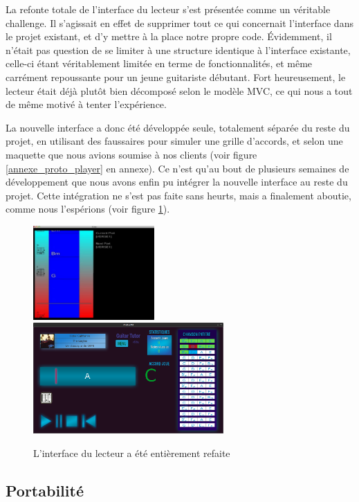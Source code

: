 \documentclass[a4paper,11pt]{article}
\begin{document}
La refonte totale de l'interface du lecteur s'est présentée comme un véritable challenge. Il s'agissait en effet de supprimer tout ce qui concernait l'interface dans le projet existant, et d'y mettre à la place notre propre code. Évidemment, il n'était pas question de se limiter à une structure identique à l'interface existante, celle-ci étant véritablement limitée en terme de fonctionnalités, et m\^eme carrément repoussante pour un jeune guitariste débutant. Fort heureusement, le lecteur était déjà plut\^ot bien décomposé selon le modèle MVC, ce qui nous a tout de m\^eme motivé à tenter l'expérience.

La nouvelle interface a donc été développée seule, totalement séparée du reste du projet, en utilisant des faussaires pour simuler une grille d'accords, et selon une maquette que nous avions soumise à nos clients (voir figure \ref{annexe_proto_player} en annexe). Ce n'est qu'au bout de plusieurs semaines de développement que nous avons enfin pu intégrer la nouvelle interface au reste du projet. Cette intégration ne s'est pas faite sans heurts, mais a finalement aboutie, comme nous l'espérions (voir figure \ref{interface_player}).

\begin{figure}[H]
\begin{center}
\includegraphics[width=175px]{ancien_player.png}
\includegraphics[width=275px]{interface_player.png}
\caption{L'interface du lecteur a été entièrement refaite}
\label{interface_player}
\end{center}
\end{figure}

\subsection{Portabilité}
\end{document}
